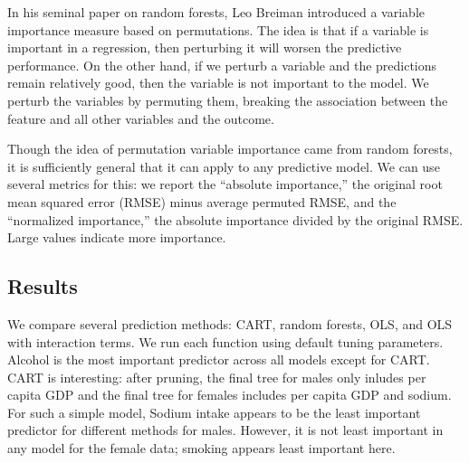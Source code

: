 \documentclass[11pt]{article}\usepackage[]{graphicx}\usepackage[]{color}
\begin{document}
In his seminal paper on random forests, Leo Breiman introduced a variable importance measure based on permutations. 
The idea is that if a variable is important in a regression, then perturbing it will worsen the predictive performance. 
On the other hand, if we perturb a variable and the predictions remain relatively good, then the variable is not important to the model. 
We perturb the variables by permuting them, breaking the association between the feature and all other variables and the outcome.

Though the idea of permutation variable importance came from random forests, it is sufficiently general that it can apply to any predictive model. 
We can use several metrics for this: 
we report the ``absolute importance,'' the original root mean squared error (RMSE) minus average permuted RMSE, and the ``normalized importance,'' the absolute importance divided by the original RMSE. 
Large values indicate more importance.

\subsection{Results}
We compare several prediction methods: CART, random forests, OLS, and OLS with interaction terms.
We run each function using default tuning parameters.
Alcohol is the most important predictor across all models except for CART.
CART is interesting: after pruning, the final tree for males only inludes per capita GDP and the final tree for females includes per capita GDP and sodium.
For such a simple model, 
Sodium intake appears to be the least important predictor for different methods for males. 
However, it is not least important in any model for the female data; smoking appears least important here.
\end{document}
